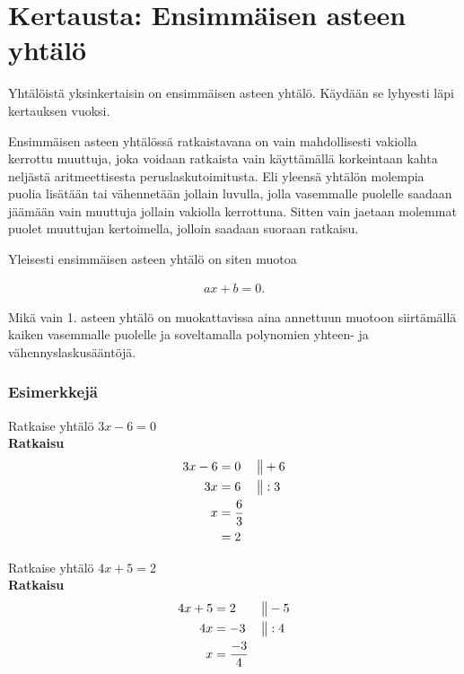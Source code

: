 \chapter{Kertausta: Ensimmäisen asteen yhtälö}

Yhtälöistä yksinkertaisin on ensimmäisen asteen yhtälö. Käydään se lyhyesti
läpi kertauksen vuoksi.

Ensimmäisen asteen yhtälössä ratkaistavana on vain mahdollisesti vakiolla
kerrottu muuttuja, joka voidaan ratkaista vain käyttämällä korkeintaan
kahta neljästä aritmeettisesta peruslaskutoimitusta. Eli yleensä
yhtälön molempia puolia lisätään tai vähennetään jollain luvulla, jolla
vasemmalle puolelle saadaan jäämään vain muuttuja jollain vakiolla kerrottuna.
Sitten vain jaetaan molemmat puolet muuttujan kertoimella, jolloin saadaan
suoraan ratkaisu.


Yleisesti ensimmäisen asteen yhtälö on siten muotoa

\begin{align*}
    ax + b = 0.
\end{align*}

Mikä vain 1. asteen yhtälö on muokattavissa aina annettuun
muotoon siirtämällä kaiken vasemmalle puolelle ja
soveltamalla polynomien yhteen- ja vähennyslaskusääntöjä.

\subsection*{Esimerkkejä}

\begin{esimerkki}
Ratkaise yhtälö $3x - 6 = 0$ \\
\textbf{Ratkaisu} \\
  \begin{align*}
    3x - 6 &= 0 & \big\| & +6 \\
        3x &= 6 & \big\| & :3 \\
         x &= \frac{6}{3} \\
           &= 2
  \end{align*}
\end{esimerkki}

\begin{esimerkki}
Ratkaise yhtälö $4x + 5 = 2$ \\
\textbf{Ratkaisu}
\begin{align*}
    4x + 5 &= 2  & \big\| & -5 \\
        4x &= -3 & \big\| & :4 \\
         x &= \frac{-3}{4}
 \end{align*}
\end{esimerkki}

